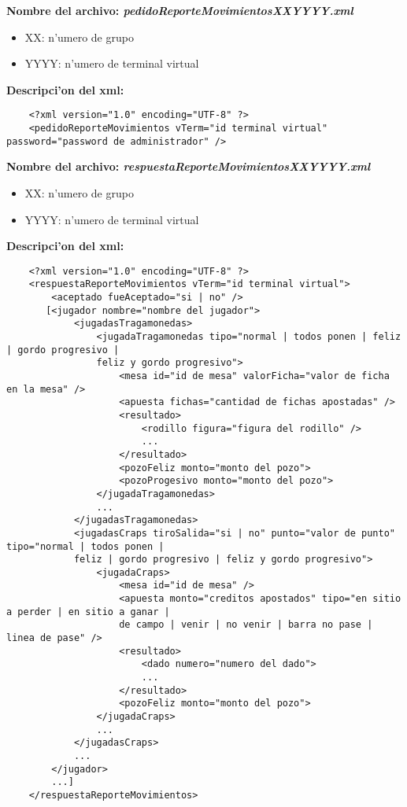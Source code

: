\bf{Nombre del archivo:} \it{pedidoReporteMovimientosXXYYYY.xml}
\begin{itemize}
    \item{XX: n'umero de grupo}
    \item{YYYY: n'umero de terminal virtual}
\end{itemize}

\bf{Descripci'on del xml:}
\begin{verbatim}
    <?xml version="1.0" encoding="UTF-8" ?>
    <pedidoReporteMovimientos vTerm="id terminal virtual" password="password de administrador" />
\end{verbatim}


\bf{Nombre del archivo:} \it{respuestaReporteMovimientosXXYYYY.xml}
\begin{itemize}
    \item{XX: n'umero de grupo}
    \item{YYYY: n'umero de terminal virtual}
\end{itemize}

\bf{Descripci'on del xml:}
\begin{verbatim}
    <?xml version="1.0" encoding="UTF-8" ?>
    <respuestaReporteMovimientos vTerm="id terminal virtual">
        <aceptado fueAceptado="si | no" />
       [<jugador nombre="nombre del jugador">
            <jugadasTragamonedas>
                <jugadaTragamonedas tipo="normal | todos ponen | feliz | gordo progresivo |
                feliz y gordo progresivo">
                    <mesa id="id de mesa" valorFicha="valor de ficha en la mesa" />
                    <apuesta fichas="cantidad de fichas apostadas" />
                    <resultado>
                        <rodillo figura="figura del rodillo" />
                        ...
                    </resultado>
                    <pozoFeliz monto="monto del pozo">
                    <pozoProgesivo monto="monto del pozo">
                </jugadaTragamonedas>
                ...
            </jugadasTragamonedas>
            <jugadasCraps tiroSalida="si | no" punto="valor de punto" tipo="normal | todos ponen |
            feliz | gordo progresivo | feliz y gordo progresivo">
                <jugadaCraps>
                    <mesa id="id de mesa" />
                    <apuesta monto="creditos apostados" tipo="en sitio a perder | en sitio a ganar |
                    de campo | venir | no venir | barra no pase | linea de pase" />
                    <resultado>
                        <dado numero="numero del dado">
                        ...
                    </resultado>
                    <pozoFeliz monto="monto del pozo">
                </jugadaCraps>
                ...
            </jugadasCraps>
            ...
        </jugador>
        ...]
    </respuestaReporteMovimientos>
\end{verbatim}


